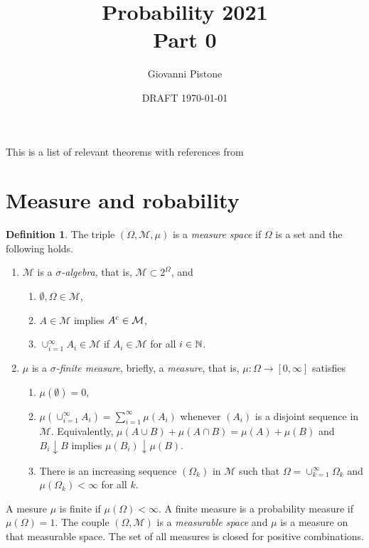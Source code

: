 \documentclass[12pt,a4paper]{amsart}
\title{Probability 2021 \\ Part 0
}
\author[G. Pistone]{Giovanni Pistone}
\date{DRAFT \today}
\theoremstyle{plain}%
\theoremstyle{definition}
\newtheorem{definition}{Definition}%
\theoremstyle{remark}
\begin{document}
\maketitle
\tableofcontents

This is a list of relevant theorems with references from \cite{rudin:1987-3rd}

\section{Measure and robability}
\label{sec:probability}

\begin{definition}
The triple $(\Omega,\mathcal M,\mu)$ is a \emph{measure space} if
$\Omega$ is a set and the following holds.
\begin{enumerate}
\item $\mathcal M$ is a \emph{$\sigma$-algebra}, that is, $\mathcal M
  \subset 2^\Omega$, and
  \begin{enumerate}
  \item $\emptyset, \Omega \in \mathcal M$,
  \item $A \in \mathcal M$ implies $A^{\text c} \in \mathcal M$,
  \item $\cup_{i=1}^{\infty} A_i \in \mathcal M$ if $A_i \in \mathcal
    M$ for all $i \in \mathbb{N}$.
  \end{enumerate}
  \item $\mu$ is a \emph{$\sigma$-finite measure}, briefly, a
    \emph{measure}, that is, $\mu \colon \Omega \to [0,\infty]$ satisfies
  \begin{enumerate} 
  \item $\mu(\emptyset) = 0$,
  \item $\mu\left(\cup_{i=1 }^\infty A_i\right) = \sum_{i=1}^\infty
    \mu(A_i)$ whenever $(A_i)$ is a disjoint sequence in $\mathcal
    M$. Equivalently, $\mu(A \cup B) + \mu(A \cap B) = \mu(A) +
    \mu(B)$ and $B_i \downarrow B$ implies $\mu(B_i) \downarrow \mu(B)$.
  \item There is an increasing sequence $(\Omega_k)$ in $\mathcal M$
    such that $\Omega = \cup_{k=1}^\infty \Omega_k$ and
    $\mu(\Omega_k) < \infty$ for all $k$.
  \end{enumerate}
\end{enumerate}
\end{definition}

A mesure $\mu$ is finite if $\mu(\Omega) < \infty$. A finite measure
is a probability measure if $\mu(\Omega) =1$. The couple
$(\Omega,\mathcal M)$ is a \emph{measurable space} and $\mu$ is a
measure on that measurable space. The set of all measures is closed
for positive combinations.
\end{document}
